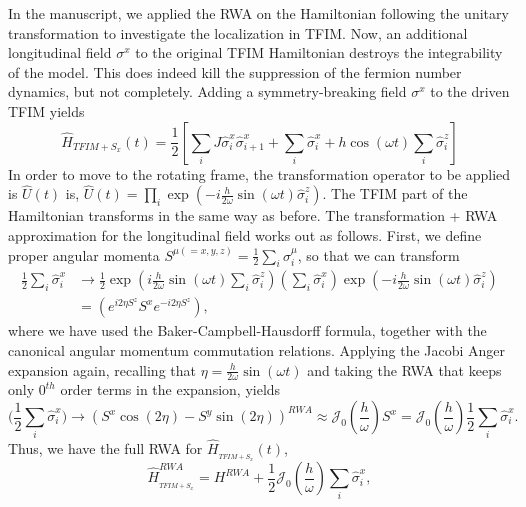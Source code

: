 \documentclass[aps,prb,reprint,showpacs,floatfix,superscriptaddress, onecolumn, nofootinbib, 9pt]{revtex4-2}
\begin{document}
\begin{enumerate}
{			In the manuscript, we applied the RWA on the Hamiltonian following the unitary transformation to investigate the localization in TFIM. Now, an additional longitudinal field $\sigma^x$ to the original TFIM Hamiltonian destroys the integrability of the model.  This does indeed kill the suppression of the fermion number dynamics, but not completely.  Adding a symmetry-breaking field $\sigma^x$ to the driven TFIM yields 
			\begin{equation}
				\hat{H}_{TFIM+S_x}(t) =\frac{1}{2}\left[\sum_{i} J \hat{\sigma}_{i}^{x} \hat{\sigma}_{i+1}^{x}+\sum_{i} \hat{\sigma}_{i}^{x}+h \cos (\omega t) \sum_{i} \hat{\sigma}_{i}^{z}\right]
			\end{equation}
			In order to move to the rotating frame, the transformation operator to be applied is $\displaystyle \hat{U}(t)$ is, $\hat{U}(t)=\prod_{i} \exp \left(-i \frac{h}{2 \omega} \sin (\omega t) \hat{\sigma}_{i}^{z}\right)$. The TFIM part of the Hamiltonian transforms in the same way as before.	The transformation + RWA approximation for the longitudinal field works out as follows. First, we define proper angular momenta $\displaystyle S^{\mu(=x,y,z)} = \frac12\sum_i \hat{\sigma}^\mu_i$, so that we can transform
			\begin{align*}
				\frac12 \sum_i \hat{\sigma}^x_i & \rightarrow\frac{1}{2} \exp \left(i \frac{h}{2 \omega} \sin (\omega t) \sum_{i} \hat{\sigma}_{i}^{z}\right)\left(\sum_{i} \hat{\sigma}_{i}^{x}\right) \exp \left(-i \frac{h}{2 \omega} \sin (\omega t) \hat{\sigma}_{i}^{z}\right) \\
				& =\left(e^{i 2 \eta S^{z}} S^{x} e^{-i 2 \eta S^{z}}\right),
			\end{align*}
			where we have used the Baker-Campbell-Hausdorff formula, together with the canonical angular momentum commutation relations. Applying the Jacobi Anger expansion again, recalling that $\eta=\frac{h}{2 \omega} \sin (\omega t)$ and taking the RWA that keeps only $0^{th}$ order terms in the expansion, yields
			\begin{equation}
				\Big(\frac12 \sum_i \hat{\sigma}^x_i\Big) \rightarrow \left(S^{x} \cos (2 \eta)-S^{y} \sin (2 \eta)\right)^{RWA} \approx \mathcal{J}_{0}\left(\frac{h}{\omega}\right) S^{x} = \mathcal{J}_{0}\left(\frac{h}{\omega}\right)\frac12\sum_i\hat{\sigma}^x_i.
			\end{equation}
			Thus, we have the full RWA for $\hat{H}_{_{TFIM+S_{x}}}(t)$,
			\begin{equation}
				\hat{H}_{_{TFIM+S_{x}}}^{R W A}= H^{RWA}+\frac12 \mathcal{J}_{0}\left(\frac{h}{\omega}\right) \sum_i\hat{\sigma}^x_i,

\end{equation}}
\end{enumerate}
\end{document}
